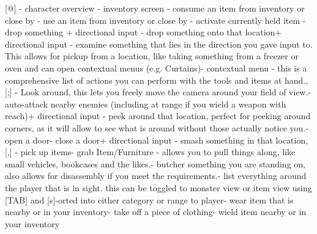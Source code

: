 [@] - character overview \newline
[i] - inventory screen \newline
[E] - consume an item from inventory or close by \newline
[a] - use an item from inventory or close by \newline
[A] - activate currently held item \newline
[d] - drop something \newline
[D] + directional input - drop something onto that location\newline
[e] + directional input - examine something that lies in the direction you gave input to. This allows for pickup from a location, like taking something from a freezer or oven and can open contextual menus (e.g. Curtains)\newline
[\%] - contextual menu - this is a comprehensive list of actions you can perform with the tools and items at hand.\newline
[x], [;] - Look around, this lets you freely move the camera around your field of view.\newline
[TAB] - auto-attack nearby enemies (including at range if you wield a weapon with reach)\newline
[X] + directional input - peek around that location, perfect for peeking around corners, as it will allow to see what is around without those actually notice you.\newline
[o] - open a door\newline
[c] - close a door\newline
[s] + directional input - smash something in that location\newline
[g], [,] - pick up items\newline
[G] - grab Item/Furniture - allows you to pull things along, like small vehicles, bookcases and the likes.\newline
[B] - butcher something you are standing on, also allows for disassembly if you meet the requirements.\newline
[V] - list everything around the player that is in sight. this can be toggled to monster view or item view using [TAB] and [s]-orted into either category or range to player\newline
[W] - wear item that is nearby or in your inventory\newline
[T] - take off a piece of clothing\newline
[w] - wield item nearby or in your inventory\newline
